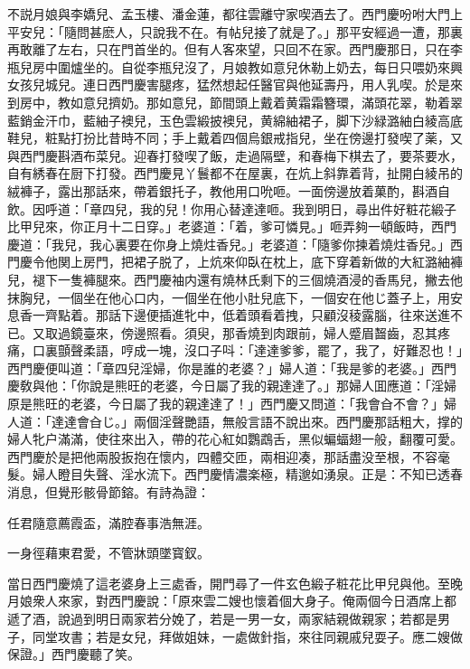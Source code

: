 不説月娘與李嬌兒、孟玉樓、潘金蓮，都往雲離守家喫酒去了。西門慶吩咐大門上平安兒：「隨問甚麽人，只說我不在。有帖兒接了就是了。」那平安經過一遭，那裏再敢離了左右，只在門首坐的。但有人客來望，只回不在家。西門慶那日，只在李瓶兒房中圍爐坐的。自從李瓶兒沒了，月娘教如意兒休勒上奶去，每日只喂奶來興女孩兒城兒。連日西門慶害腿疼，猛然想起任醫官與他延壽丹，用人乳喫。於是來到房中，教如意兒擠奶。那如意兒，節間頭上戴着黄霜霜簪環，滿頭花翠，勒着翠藍銷金汗巾，藍紬子襖兒，玉色雲緞披襖兒，黄綿紬裙子，脚下沙緑潞紬白綾高底鞋兒，粧點打扮比昔時不同；手上戴着四個烏銀戒指兒，坐在傍邊打發喫了薬，又與西門慶斟酒布菜兒。迎春打發喫了飯，走過隔壁，和春梅下棋去了，要茶要水，自有綉春在厨下打發。西門慶見丫鬟都不在屋裏，在炕上斜靠着背，扯開白綾吊的絨褲子，露出那話來，帶着銀托子，教他用口吮咂。一面傍邊放着菓酌，斟酒自飲。因呼道：「章四兒，我的兒！你用心替達達咂。我到明日，尋出件好粧花緞子比甲兒來，你正月十二日穿。」老婆道：「着，爹可憐見。」咂弄夠一頓飯時，西門慶道：「我兒，我心裏要在你身上燒炷香兒。」老婆道：「隨爹你揀着燒炷香兒。」西門慶令他関上房門，把裙子脱了，上炕來仰臥在枕上，底下穿着新做的大紅潞紬褲兒，褪下一隻褲腿來。西門慶袖内還有燒林氏剩下的三個燒酒浸的香馬兒，撇去他抹胸兒，一個坐在他心口内，一個坐在他小肚兒底下，一個安在他じ蓋子上，用安息香一齊點着。那話下邊便插進牝中，低着頭看着拽，只顧沒稜露腦，往來送進不已。又取過鏡臺來，傍邊照看。須臾，那香燒到肉跟前，婦人蹙眉齧齒，忍其疼痛，口裏顫聲柔語，哼成一塊，沒口子呌：「達達爹爹，罷了，我了，好難忍也！」西門慶便叫道：「章四兒淫婦，你是誰的老婆？」婦人道：「我是爹的老婆。」西門慶敎與他：「你說是熊旺的老婆，今日屬了我的親達達了。」那婦人囬應道：「淫婦原是熊旺的老婆，今日屬了我的親達達了！」西門慶又問道：「我會㒲不會？」婦人道：「達達會㒲じ。」兩個淫聲艷語，無般言語不說出來。西門慶那話粗大，撑的婦人牝户滿滿，使往來出入，帶的花心紅如鸚鵡舌，黑似蝙蝠翅一般，翻覆可愛。西門慶於是把他兩股扳抱在懷内，四體交匝，兩相迎凑，那話盡没至根，不容毫髮。婦人瞪目失聲、淫水流下。西門慶情濃楽極，精邈如湧泉。正是：不知已透春消息，但覺形骸骨節鎔。有詩為證：

任君隨意薦霞盃，滿腔春事浩無涯。

一身徑藉東君愛，不管牀頭墜寳釵。

當日西門慶燒了這老婆身上三處香，開門尋了一件玄色緞子粧花比甲兒與他。至晚月娘衆人來家，對西門慶說：「原來雲二嫂也懷着個大身子。俺兩個今日酒席上都遞了酒，說過到明日兩家若分娩了，若是一男一女，兩家結親做親家；若都是男子，同堂攻書；若是女兒，拜做姐妹，一處做針指，來往同親戚兒耍子。應二嫂做保證。」西門慶聽了笑。

